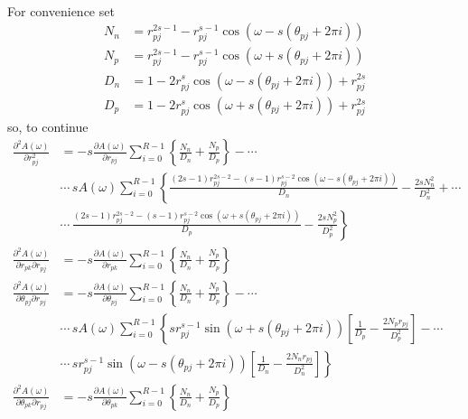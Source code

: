 \documentclass[a4paper,twoside,10pt,english]{report}
\begin{document}
\begin{raggedbottom}
\begin{align*}
\end{align*}
For convenience set
\begin{align*}
N_{n} &= r_{pj}^{2s-1}-r_{pj}^{s-1}\cos\left(\omega-s\left(\theta_{pj}+2\pi i\right)\right)\\
N_{p} &= r_{pj}^{2s-1}-r_{pj}^{s-1}\cos\left(\omega+s\left(\theta_{pj}+2\pi i\right)\right)\\
D_{n} &= 1-2r_{pj}^{s}\cos\left(\omega-s\left(\theta_{pj}+2\pi i\right)\right)+r_{pj}^{2s}\\
D_{p} &= 1-2r_{pj}^{s}\cos\left(\omega+s\left(\theta_{pj}+2\pi i\right)\right)+r_{pj}^{2s}
\end{align*}
so, to continue
\begin{align*}
\frac{\partial^{2}A\left(\omega\right)}{\partial r_{pj}^{2}} &= -s\frac{\partial A\left(\omega\right)}{\partial r_{pj}}\sum_{i=0}^{R-1}\left\{ \frac{N_{n}}{D_{n}}+\frac{N_{p}}{D_{p}}\right\} -\cdots\\
 & \cdots\, sA\left(\omega\right)\sum_{i=0}^{R-1}\left\{ \frac{\left(2s-1\right)r_{pj}^{2s-2}-\left(s-1\right)r_{pj}^{s-2}\cos\left(\omega-s\left(\theta_{pj}+2\pi i\right)\right)}{D_{n}}-\frac{2sN_{n}^{2}}{D_{n}^{2}}+\cdots\right.\\
 & \left.\cdots\,\frac{\left(2s-1\right)r_{pj}^{2s-2}-\left(s-1\right)r_{pj}^{s-2}\cos\left(\omega+s\left(\theta_{pj}+2\pi i\right)\right)}{D_{p}}-\frac{2sN_{p}^{2}}{D_{p}^{2}}\right\} \\
\frac{\partial^{2}A\left(\omega\right)}{\partial r_{pk}\partial r_{pj}} &= -s\frac{\partial A\left(\omega\right)}{\partial r_{pk}}\sum_{i=0}^{R-1}\left\{ \frac{N_{n}}{D_{n}}+\frac{N_{p}}{D_{p}}\right\} \\
\frac{\partial^{2}A\left(\omega\right)}{\partial\theta_{pj}\partial r_{pj}} &= -s\frac{\partial A\left(\omega\right)}{\partial\theta_{pj}}\sum_{i=0}^{R-1}\left\{ \frac{N_{n}}{D_{n}}+\frac{N_{p}}{D_{p}}\right\} -\cdots\\
 & \cdots\, sA\left(\omega\right)\sum_{i=0}^{R-1}\left\{ sr_{pj}^{s-1}\sin\left(\omega+s\left(\theta_{pj}+2\pi i\right)\right)\left[\frac{1}{D_{p}}-\frac{2N_{p}r_{pj}}{D_{p}^{2}}\right]-\cdots\right.\\
 & \left.\cdots\, sr_{pj}^{s-1}\sin\left(\omega-s\left(\theta_{pj}+2\pi i\right)\right)\left[\frac{1}{D_{n}}-\frac{2N_{n}r_{pj}}{D_{n}^{2}}\right]\right\} \\
\frac{\partial^{2}A\left(\omega\right)}{\partial\theta_{pk}\partial r_{pj}} &= -s\frac{\partial A\left(\omega\right)}{\partial\theta_{pk}}\sum_{i=0}^{R-1}\left\{ \frac{N_{n}}{D_{n}}+\frac{N_{p}}{D_{p}}\right\} \\

\end{align*}
\end{raggedbottom}
\end{document}
